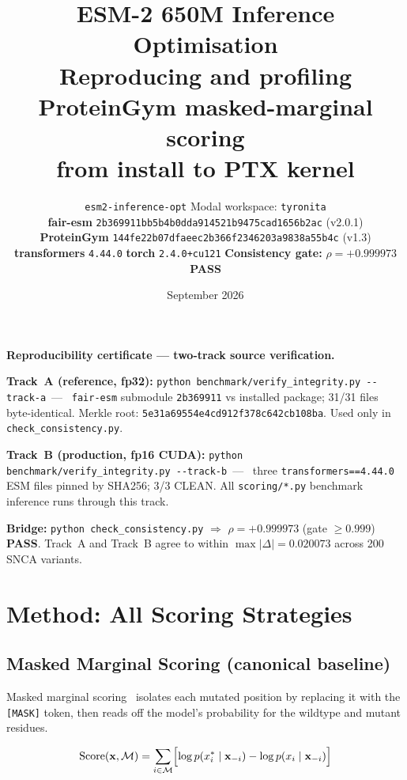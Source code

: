 \documentclass[11pt,a4paper]{article}
\title{%
  \textbf{ESM-2 650M Inference Optimisation}\\[0.4em]
  \large Reproducing and profiling ProteinGym masked-marginal scoring\\
  from install to PTX kernel
}
\author{%
  \texttt{esm2-inference-opt} \quad
  Modal workspace: \texttt{tyronita}\\[0.3em]
  \small
  \textbf{fair-esm} \texttt{2b369911bb5b4b0dda914521b9475cad1656b2ac} (v2.0.1)\\
  \textbf{ProteinGym} \texttt{144fe22b07dfaeec2b366f2346203a9838a55b4c} (v1.3)\\
  \textbf{transformers} \texttt{4.44.0} \quad
  \textbf{torch} \texttt{2.4.0+cu121} \quad
  \textbf{Consistency gate:} $\rho = +0.999973$ \textcolor{pass}{\textbf{PASS}}
}
\date{September 2026}
\begin{document}
\maketitle
\tableofcontents
\newpage

\begin{integritybox}
\textbf{Reproducibility certificate — two-track source verification.}

\textbf{Track~A (reference, fp32):}
\lstinline|python benchmark/verify_integrity.py --track-a|~—~
\texttt{fair-esm} submodule \texttt{2b369911} vs installed package; 31/31 files byte-identical.
Merkle root: \texttt{\textcolor{sha}{5e31a69554e4cd912f378c642cb108ba}}.
Used only in \texttt{check\_consistency.py}.

\textbf{Track~B (production, fp16 CUDA):}
\lstinline|python benchmark/verify_integrity.py --track-b|~—~
three \texttt{transformers==4.44.0} ESM files pinned by SHA256; 3/3 CLEAN.
All \texttt{scoring/*.py} benchmark inference runs through this track.

\textbf{Bridge:}
\lstinline|python check_consistency.py| $\Rightarrow$ $\rho = +0.999973$ (gate $\geq 0.999$) \textbf{PASS}.
Track~A and Track~B agree to within $\max|\Delta|=0.020073$ across 200 SNCA variants.
\end{integritybox}

\section{Method: All Scoring Strategies}

\subsection{Masked Marginal Scoring (canonical baseline)}

Masked marginal scoring~\cite{meier2021language} isolates each mutated
position by replacing it with the \texttt{[MASK]} token, then reads off
the model's probability for the wildtype and mutant residues.

\begin{equation}
  \text{Score}(\mathbf{x}, \mathcal{M}) =
    \sum_{i \in \mathcal{M}}
    \Bigl[
      \log p\!\left(x^*_i \mid \mathbf{x}_{-i}\right)
      -
      \log p\!\left(x_i \mid \mathbf{x}_{-i}\right)
    \Bigr]
  \label{eq:masked}
\end{equation}
\end{document}
